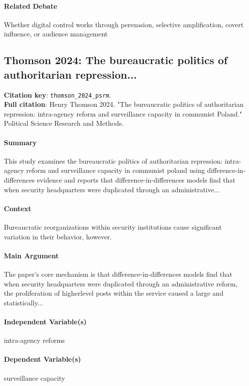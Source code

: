 \documentclass[12pt]{article}
\begin{document}
\paragraph{Related Debate} Whether digital control works through persuasion, selective amplification, covert influence, or audience management


\subsection{Thomson 2024: The bureaucratic politics of authoritarian repression...}
\textbf{Citation key}: \texttt{thomson\_2024\_psrm}.\\
\textbf{Full citation}: Henry Thomson 2024. "The bureaucratic politics of authoritarian repression: intra-agency reform and surveillance capacity in communist Poland." Political Science Research and Methods.

\paragraph{Summary} This study examines the bureaucratic politics of authoritarian repression: intra-agency reform and surveillance capacity in communist poland using difference-in-differences evidence and reports that difference-in-differences models find that when security headquarters were duplicated through an administrative...

\paragraph{Context} Bureaucratic reorganizations within security institutions cause significant variation in their behavior, however.

\paragraph{Main Argument} The paper's core mechanism is that difference-in-differences models find that when security headquarters were duplicated through an administrative reform, the proliferation of higherlevel posts within the service caused a large and statistically...

\paragraph{Independent Variable(s)} intra-agency reforms

\paragraph{Dependent Variable(s)} surveillance capacity
\end{document}
